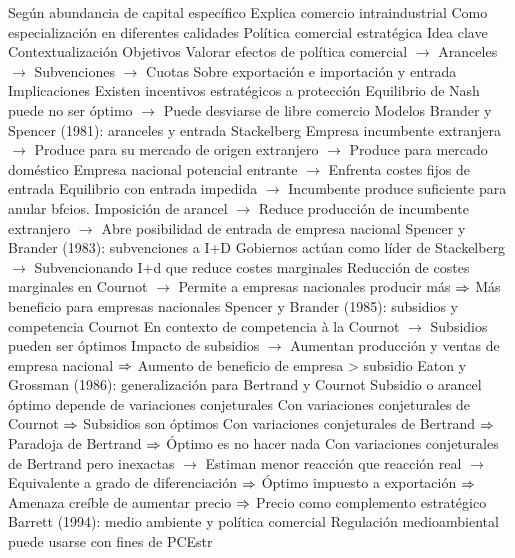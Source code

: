 \documentclass{nuevotema}
\begin{document}
\begin{esquemal}
				\4[] Según abundancia de capital específico
				\4 Explica comercio intraindustrial
				\4[] Como especialización en diferentes calidades
		\2 Política comercial estratégica
			\3 Idea clave
				\4 Contextualización
				\4 Objetivos
				\4[] Valorar efectos de política comercial
				\4[] $\to$ Aranceles
				\4[] $\to$ Subvenciones
				\4[] $\to$ Cuotas
				\4[] Sobre exportación e importación y entrada
				\4 Implicaciones
				\4[] Existen incentivos estratégicos a protección
				\4[] Equilibrio de Nash puede no ser óptimo
				\4[] $\to$ Puede desviarse de libre comercio
			\3 Modelos
				\4 Brander y Spencer (1981): aranceles y entrada Stackelberg
				\4[] Empresa incumbente extranjera
				\4[] $\to$ Produce para su mercado de origen extranjero
				\4[] $\to$ Produce para mercado doméstico
				\4[] Empresa nacional potencial entrante
				\4[] $\to$ Enfrenta costes fijos de entrada
				\4[] Equilibrio con entrada impedida
				\4[] $\to$ Incumbente produce suficiente para anular bfcios.
				\4[] Imposición de arancel
				\4[] $\to$ Reduce producción de incumbente extranjero
				\4[] $\to$ Abre posibilidad de entrada de empresa nacional
				\4 Spencer y Brander (1983): subvenciones a I+D
				\4[] Gobiernos actúan como líder de Stackelberg
				\4[] $\to$ Subvencionando I+d que reduce costes marginales
				\4[] Reducción de costes marginales en Cournot
				\4[] $\to$ Permite a empresas nacionales producir más
				\4[] $\Rightarrow$ Más beneficio para empresas nacionales
				\4 Spencer y Brander (1985): subsidios y competencia Cournot
				\4[] En contexto de competencia à la Cournot
				\4[] $\to$ Subsidios pueden ser óptimos
				\4[] Impacto de subsidios
				\4[] $\to$ Aumentan producción y ventas de empresa nacional
				\4[] $\Rightarrow$ Aumento de beneficio de empresa > subsidio
				\4 Eaton y Grossman (1986): generalización para Bertrand y Cournot
				\4[] Subsidio o arancel óptimo depende de variaciones conjeturales
				\4[] Con variaciones conjeturales de Cournot
				\4[] $\Rightarrow$ Subsidios son óptimos
				\4[] Con variaciones conjeturales de Bertrand
				\4[] $\Rightarrow$ Paradoja de Bertrand
				\4[] $\Rightarrow$ Óptimo es no hacer nada
				\4[] Con variaciones conjeturales de Bertrand pero inexactas
				\4[] $\to$ Estiman menor reacción que reacción real
				\4[] $\to$ Equivalente a grado de diferenciación
				\4[] $\Rightarrow$ Óptimo impuesto a exportación
				\4[] $\Rightarrow$ Amenaza creíble de aumentar precio
				\4[] $\Rightarrow$ Precio como complemento estratégico
				\4 Barrett (1994): medio ambiente y política comercial
				\4[] Regulación medioambiental puede usarse con fines de PCEstr

\end{esquemal}
\end{document}
